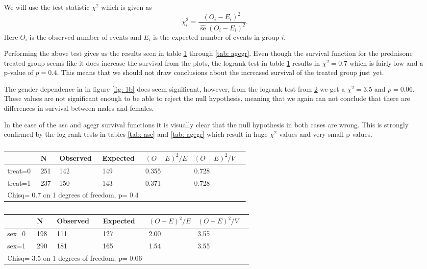 \documentclass[a4paper, 10pt, reqno]{amsart}
\begin{document}
We will use the test statistic $\chi^2$ which is given as
\begin{equation}
    \chi^{2}_i=\frac{\left(O_{i}-E_{i}\right)^{2}}{\widehat{\operatorname{se}}\left(O_{i}-E_{i}\right)^{2}}.
\end{equation}
Here $O_i$ is the observed number of events and $E_i$ is the expected number of events in group $i$. 

Performing the above test gives us the results seen in table \ref{tab: treat} through \ref{tab: agegr}. Even though the survival function for the prednisone treated group seems like it does increase the survival from the plots, the logrank test in table \ref{tab: treat} results in $\chi^2 = 0.7$ which is fairly low and a p-value of $p=0.4$. This means that we should not draw conclusions about the increased survival of the treated group just yet. 

The gender dependence in in figure \ref{fig: 1b} does seem significant, however, from the logrank test from \ref{tab: sex} we get a $\chi^2 = 3.5$ and $p = 0.06$. These values are not significant enough to be able to reject the null hypothesis, meaning that we again can not conclude that there are differences in survival between males and females. 

In the case of the asc and agegr survival functions it is visually clear that the null hypothesis in both cases are wrong. This is strongly confirmed by the log rank tests in tables \ref{tab: asc} and \ref{tab: agegr} which result in huge $\chi^2$ values and very small p-values.


\begin{table}
\caption{}
\label{tab: treat}
\begin{tabular}{lllllll}
\hline\hline
 & N  & Observed & Expected &$(O-E)^2/E$ & $(O-E)^2/V$\\ \hline
treat=0 &251  &    142   &   149 &    0.355  &   0.728\\
treat=1 &237   &   150    &  143 &    0.371  &   0.728\\
\multicolumn{4}{l}{Chisq= 0.7  on 1 degrees of freedom, p= 0.4 }\\
\hline

\end{tabular}
\end{table}
\begin{table}
\caption{}
\label{tab: sex}
\begin{tabular}{lllllll}
\hline\hline
 & N  & Observed & Expected &$(O-E)^2/E$ & $(O-E)^2/V$\\ \hline
sex=0 &198  &    111   &   127   &   2.00  &    3.55\\
sex=1 &290  &    181   &   165   &   1.54   &   3.55\\
\multicolumn{4}{l}{Chisq= 3.5  on 1 degrees of freedom, p= 0.06 }\\
\hline

\end{tabular}
\end{table}
\end{document}
